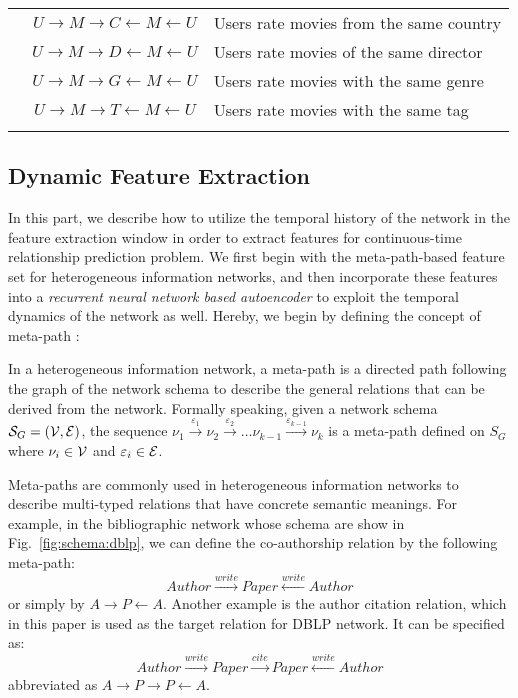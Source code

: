\begin{table}[t]
\begin{tabular} {c c l}
		& $U\rightarrow M\rightarrow C\leftarrow M\leftarrow U$ & Users rate movies from the same country\\
		& $U\rightarrow M\rightarrow D\leftarrow M\leftarrow U$ & Users rate movies of the same director\\
		& $U\rightarrow M\rightarrow G\leftarrow M\leftarrow U$ & Users rate movies with the same genre\\
		& $U\rightarrow M\rightarrow T\leftarrow M\leftarrow U$ & Users rate movies with the same tag\\
		&&\\
		\bottomrule
	\end{tabular}
\end{table}

\subsection{Dynamic Feature Extraction}
In this part, we describe how to utilize the temporal history of the network in the feature extraction window in order to extract features for continuous-time relationship prediction problem. We first begin with the meta-path-based feature set for heterogeneous information networks, and then incorporate these features into a \emph{recurrent neural network based autoencoder} to exploit the temporal dynamics of the network as well. Hereby, we begin by defining the concept of meta-path \cite{sun2011pathsim}:

\begin{definition}
	In a heterogeneous information network, a meta-path is a directed path following the graph of the network schema to describe the general relations that can be derived from the network. Formally speaking, given a network schema $\mathcal{S}_G=(\mathcal{V}, \mathcal{E})$, the sequence $\nu_1\xrightarrow{\varepsilon_1}\nu_2\xrightarrow{\varepsilon_2}\dots\nu_{k-1}\xrightarrow{\varepsilon_{k-1}}\nu_k$ is a meta-path defined on $S_G$ where $\nu_i\in \mathcal{V}$ and $\varepsilon_i\in \mathcal{E}$.
\end{definition} 

Meta-paths are commonly used in heterogeneous information networks to describe multi-typed relations that have concrete semantic meanings. For example, in the bibliographic network whose schema are show in Fig.~\ref{fig:schema:dblp}, we can define the co-authorship relation by the following meta-path:
\[Author\xrightarrow{write}Paper\xleftarrow{write}Author\]
or simply by $A\rightarrow P\leftarrow A$. Another example is the author citation relation, which in this paper is used as the target relation for DBLP network. It can be specified as:
\[Author\xrightarrow{write}Paper\xrightarrow{cite}Paper\xleftarrow{write}Author\]
abbreviated as $A\rightarrow P\rightarrow P\leftarrow A$.

